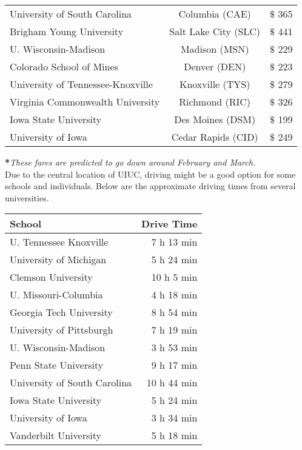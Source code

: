\begin{center}
\begin{tabular}{lcc}
		University of South Carolina & Columbia (CAE) & $\$$ 365\\
		Brigham Young University & Salt Lake City (SLC) & $\$$ 441\\
		U. Wisconsin-Madison & Madison (MSN) & $\$$ 229\\
		Colorado School of Mines & Denver (DEN)& $\$$ 223\\
		University of  Tennessee-Knoxville & Knoxville (TYS) & $\$$ 279\\
		Virginia Commonwealth University & Richmond (RIC) & $\$$ 326 \\
		Iowa State University & Des Moines (DSM) & $\$$ 199 \\
		University of Iowa & Cedar Rapids (CID) & $\$$ 249 \\
	\end{tabular}	
\end{center}
\textbf{*}\textit{These fares are predicted to go down around February and March.}\\

Due to the central location of UIUC, driving might be a good option for some schools and individuals. Below are the approximate driving times from several universities. 
\begin{center}
	\begin{tabular}{l r}
	\hline\hline
	\textbf{School}& \textbf{Drive Time}\\
	\hline\hline
	U. Tennessee Knoxville & 7 h 13 min\\
	University of Michigan & 5 h 24 min\\
	Clemson University & 10 h 5 min\\
	U. Missouri-Columbia & 4 h 18 min\\
	Georgia Tech University & 8 h 54 min \\
	University of Pittsburgh & 7 h 19 min\\
	U. Wisconsin-Madison & 3 h 53 min \\
	Penn State University & 9 h 17 min\\
	University of South Carolina& 10 h 44 min\\
	Iowa State University & 5 h 24 min \\
	University of Iowa & 3 h 34 min\\
	Vanderbilt University & 5 h 18 min\\
	\end{tabular}
\end{center}
